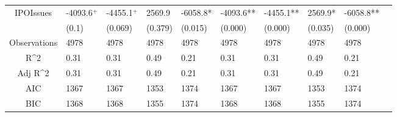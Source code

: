 \documentclass{article}
\begin{document}
\begin{table}[H]
\begin{tabular}{|clllllllll|}
  IPOIssues & -4093.6$^{+}$ & -4455.1$^{+}$ & 2569.9 & -6058.8* & -4093.6** & -4455.1** & 2569.9* & -6058.8** & \\ 
   & (0.1) & (0.069) & (0.379) & (0.015) & (0.000) & (0.000) & (0.035) & (0.000) & \\ 
  \hline 
 Observations & 4978 & 4978 & 4978 & 4978 & 4978 & 4978 & 4978 & 4978 & \\ 
  R^2 & 0.31 & 0.31 & 0.49 & 0.21 & 0.31 & 0.31 & 0.49 & 0.21 & \\ 
  Adj R^2 & 0.31 & 0.31 & 0.49 & 0.21 & 0.31 & 0.31 & 0.49 & 0.21 & \\ 
  AIC & 1367 & 1367 & 1353 & 1374 & 1367 & 1367 & 1353 & 1374 & \\ 
  BIC & 1368 & 1368 & 1355 & 1374 & 1368 & 1368 & 1355 & 1374 & \\ 
   \hline
\end{tabular}
 
\end{table}
\end{document}
